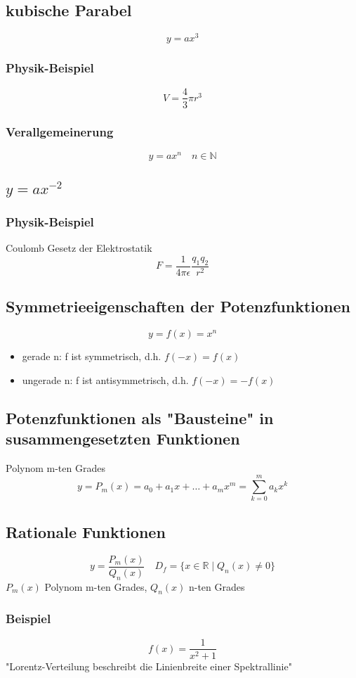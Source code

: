 \documentclass[a4paper]{scrartcl}
\begin{document}
\subsection{kubische Parabel}
\label{sec-5-2}
\[y=a x^3\]
\subsubsection{Physik-Beispiel}
\label{sec-5-2-1}
\[V=\frac{4}{3}\pi r^3\]
\subsubsection{Verallgemeinerung}
\label{sec-5-2-2}
\[y=a x^n\quad n\in\mathbb{N}\]
\subsection{$y=a x^{-2}$}
\label{sec-5-3}
\subsubsection{Physik-Beispiel}
\label{sec-5-3-1}
Coulomb Gesetz der Elektrostatik \[F=\frac{1}{4\pi\epsilon}\frac{q_1 q_2}{r^2}\]
\subsection{Symmetrieeigenschaften der Potenzfunktionen}
\label{sec-5-4}
\[y=f(x)=x^n\]
\begin{itemize}
\item gerade n: f ist symmetrisch, d.h. $f(-x) = f(x)$
\item ungerade n: f ist antisymmetrisch, d.h. $f(-x) = -f(x)$
\end{itemize}
\subsection{Potenzfunktionen als "Bausteine" in susammengesetzten Funktionen}
\label{sec-5-5}
Polynom m-ten Grades \[y=P_m(x) = a_0 + a_1 x + \ldots + a_m x^m = \sum_{k=0}^m a_k x^k\]
\subsection{Rationale Funktionen}
\label{sec-5-6}
\[y=\frac{P_m(x)}{Q_n(x)}\quad D_f = \{x\in\mathbb{R}\mid Q_n(x)\neq 0\}\]
$P_m(x)$ Polynom m-ten Grades, $Q_n(x)$ n-ten Grades
\subsubsection{Beispiel}
\label{sec-5-6-1}
\[f(x) = \frac{1}{x^2 + 1}\]
"Lorentz-Verteilung beschreibt die Linienbreite einer Spektrallinie"
\end{document}
